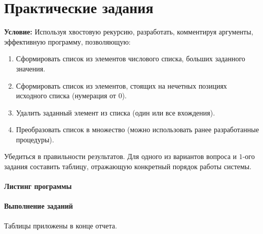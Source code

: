 \chapter{Практические задания}

\textbf{Условие:} Используя  хвостовую рекурсию,  разработать, комментируя  аргументы, эффективную программу, позволяющую:

\begin{enumerate}
	\item Сформировать  список  из  элементов числового  списка, больших  заданного значения.
	\item Сформировать список из элементов, стоящих на нечетных позициях исходного списка (нумерация от $0$).
	\item Удалить заданный элемент из списка (один или все вхождения).
	\item Преобразовать список в множество (можно использовать ранее разработанные процедуры).
\end{enumerate}

Убедиться в правильности результатов. Для  одного из вариантов вопроса и $1$-ого задания составить  таблицу, отражающую конкретный порядок работы системы.

\subsubsection{Листинг программы}



\subsubsection{Выполнение заданий}

Таблицы приложены в конце отчета.
